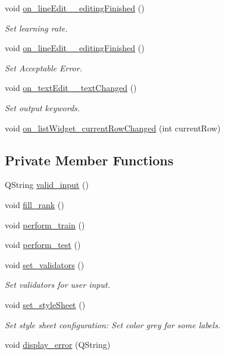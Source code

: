 \begin{DoxyCompactItemize}
void \hyperlink{a00002_a6aff5c3694d19ebd2bd81010c239cf62}{on\-\_\-line\-Edit\-\_\-\_\-editing\-Finished} ()
\begin{DoxyCompactList}\small\item\em Set learning rate. \end{DoxyCompactList}\item 
void \hyperlink{a00002_a6bcefb22fdfb8fbd3146eab38a0023d7}{on\-\_\-line\-Edit\-\_\-\_\-editing\-Finished} ()
\begin{DoxyCompactList}\small\item\em Set Acceptable Error. \end{DoxyCompactList}\item 
void \hyperlink{a00002_a39f58394bb8e9691a7b32774114a910a}{on\-\_\-text\-Edit\-\_\-\_\-text\-Changed} ()
\begin{DoxyCompactList}\small\item\em Set output keywords. \end{DoxyCompactList}\item 
void \hyperlink{a00002_a073c74e8357311d12c523d73414ee265}{on\-\_\-list\-Widget\-\_\-current\-Row\-Changed} (int current\-Row)
\end{DoxyCompactItemize}
\subsection*{Private Member Functions}
\begin{DoxyCompactItemize}
\item 
Q\-String \hyperlink{a00002_a5ec9d8a051303b218c4542f96a87b56f}{valid\-\_\-input} ()
\item 
void \hyperlink{a00002_a8e8c5918a3a0ddfd352c62e7348d3d74}{fill\-\_\-rank} ()
\item 
void \hyperlink{a00002_ad1bb069dee02010a61045c91f5e7752f}{perform\-\_\-train} ()
\item 
void \hyperlink{a00002_ade6ba53055965b3522fa3cd022e4c5e0}{perform\-\_\-test} ()
\item 
void \hyperlink{a00002_abd9fac4d8ad5334cc48afb0513544898}{set\-\_\-validators} ()
\begin{DoxyCompactList}\small\item\em Set validators for user input. \end{DoxyCompactList}\item 
void \hyperlink{a00002_a5683a1862ec1a85cf87d9c5f6fc528e9}{set\-\_\-style\-Sheet} ()
\begin{DoxyCompactList}\small\item\em Set style sheet configuration\-: Set color grey for some labels. \end{DoxyCompactList}\item 
void \hyperlink{a00002_a69ac504cf1500a8c6283d8721b09aeb2}{display\-\_\-error} (Q\-String)
\end{DoxyCompactItemize}
